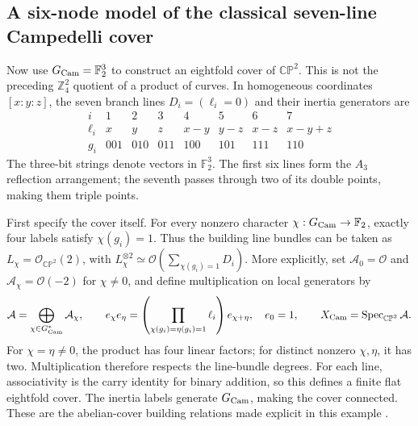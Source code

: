 \documentclass[a4paper,11pt]{article}
\numberwithin{equation}{section}
\theoremstyle{definition}
\newcommand{\CP}{\mathbb{CP}}
\newcommand{\Z}{\mathbb Z}
\begin{document}
\subsection{A six-node model of the classical seven-line Campedelli cover}\label{sec:campedelli-seven-lines}
Now use $G_{\rm Cam}=\mathbb F_2^3$ to construct an eightfold cover of $\CP^2$.
This is not the preceding $\Z_4^2$ quotient of a product of curves.
In homogeneous coordinates $[x:y:z]$, the seven branch lines $D_i=(\ell_i=0)$ and their inertia generators are
\begin{equation}\label{eq:campedelli-lines}
\begin{array}{c|rrrrrrr}
i&1&2&3&4&5&6&7\\ \hline
\ell_i&x&y&z&x-y&y-z&x-z&x-y+z\\
g_i&001&010&011&100&101&111&110
\end{array}
\end{equation}
The three-bit strings denote vectors in $\mathbb F_2^3$.
The first six lines form the $A_3$ reflection arrangement; the seventh passes through two of its double points, making them triple points.

First specify the cover itself. For every nonzero character $\chi:G_{\rm Cam}\to\mathbb F_2$,
exactly four labels satisfy $\chi(g_i)=1$. Thus the building line bundles can be taken as
$L_\chi=\mathcal O_{\CP^2}(2)$, with
$L_\chi^{\otimes2}\simeq\mathcal O(\sum_{\chi(g_i)=1}D_i)$.
More explicitly, set $\mathcal A_0=\mathcal O$ and
$\mathcal A_\chi=\mathcal O(-2)$ for $\chi\ne0$, and define multiplication on local generators by
\begin{equation}\label{eq:campedelli-cover-algebra}
\mathcal A=\bigoplus_{\chi\in G_{\rm Cam}^*}\mathcal A_\chi,
\qquad
e_\chi e_\eta=
\left(\prod_{\chi(g_i)=\eta(g_i)=1}\ell_i\right)e_{\chi+\eta},
\quad e_0=1,
\qquad X_{\rm Cam}=\operatorname{Spec}_{\CP^2}\mathcal A.
\end{equation}
For $\chi=\eta\ne0$, the product has four linear factors; for distinct nonzero $\chi,\eta$, it has two.
Multiplication therefore respects the line-bundle degrees. For each line, associativity is the carry identity for binary addition,
so this defines a finite flat eightfold cover. The inertia labels generate $G_{\rm Cam}$, making the cover connected.
These are the abelian-cover building relations made explicit in this example \cite[\S2.2]{AlexeevPardini}.
\end{document}

